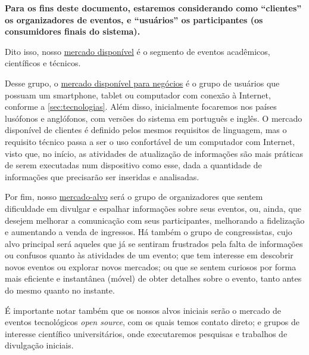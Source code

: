 \documentclass[12pt,a4paper,twoside,hyphens,english,brazil]{abntex2}
\begin{document}
\textbf{Para os fins deste documento, estaremos considerando como ``clientes'' os organizadores de eventos, e ``usuários'' os participantes (os consumidores finais do sistema).}

Dito isso, nosso \underline{mercado disponível} é o segmento de eventos acadêmicos, científicos e técnicos.

Desse grupo, o \underline{mercado disponível para negócios} é o grupo de usuários que possuam um smartphone, tablet ou computador com conexão à Internet, conforme a \autoref{sec:tecnologias}. Além disso, inicialmente focaremos nos países lusófonos e anglófonos, com versões do sistema em português e inglês. O mercado disponível de clientes é definido pelos mesmos requisitos de linguagem, mas o requisito técnico passa a ser o uso confortável de um computador com Internet, visto que, no início, as atividades de atualização de informações são mais práticas de serem executadas num dispositivo como esse, dada a quantidade de informações que precisarão ser inseridas e analisadas.

Por fim, nosso \underline{mercado-alvo} será o grupo de organizadores que sentem dificuldade em divulgar e espalhar informações sobre seus eventos, ou, ainda, que desejem melhorar a comunicação com seus participantes, melhorando a fidelização e aumentando a venda de ingressos. Há também o grupo de congressistas, cujo alvo principal será aqueles que já se sentiram frustrados pela falta de informações ou confusos quanto às atividades de um evento; que tem interesse em descobrir novos eventos ou explorar novos mercados; ou que se sentem curiosos por forma mais eficiente e instantânea (móvel) de obter detalhes sobre o evento, tanto antes do mesmo quanto no instante.


É importante notar também que os nossos alvos iniciais serão o mercado de eventos tecnológicos \emph{open source}, com os quais temos contato direto; e grupos de interesse científico universitários, onde executaremos pesquisas e trabalhos de divulgação iniciais.
\end{document}
